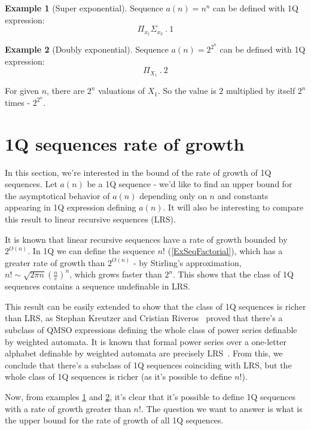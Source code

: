 \documentclass[12pt]{article}
\theoremstyle{definition}
\newtheorem{example}{Example}[section]
\begin{document}
\begin{example}[Super exponential]
\label{ExSeqNToN}
    Sequence $a(n) = n^n$ can be defined with 1Q expression:
    $$\Pi_{x_1}\Sigma_{x_2} \ . \ 1$$
\end{example}

\begin{example}[Doubly exponential]
\label{ExSeqDoubleExponential}
    Sequence $a(n) = 2^{2^n}$ can be defined with 1Q expression:
    $$\Pi_{X_1} \ . \ 2$$

    For given $n$, there are $2^n$ valuations of $X_1$. So the value is $2$ multiplied by itself $2^n$ times - $2^{2^n}$.
\end{example}

\section{1Q sequences rate of growth}
\label{Sec1QRateOfGrowth}
In this section, we're interested in the bound of the rate of growth of 1Q sequences. Let $a(n)$ be a 1Q sequence - we'd like to find an upper bound for the asymptotical behavior of $a(n)$ depending only on $n$ and constants appearing in 1Q expression defining $a(n)$. It will also be interesting to compare this result to linear recursive sequences (LRS).

It is known that linear recursive sequences have a rate of growth bounded by $2^{O(n)}$. In 1Q we can define the sequence $n!$ (\ref{ExSeqFactorial}), which has a greater rate of growth than $2^{O(n)}$ - by Stirling's approximation, $n! \sim \sqrt{2 \pi n} (\frac{n}{e})^n$, which grows faster than $2^n$. This shows that the class of 1Q sequences contains a sequence undefinable in LRS.

This result can be easily extended to show that the class of 1Q sequences is richer than LRS, as Stephan Kreutzer and Cristian Riveros~\cite{KreutzerR13} proved that there's a subclass of QMSO expressions defining the whole class of power series definable by weighted automata. It is known that formal power series over a one-letter alphabet definable by weighted automata are precisely LRS~\cite{BarloyFLM22}. From this, we conclude that there's a subclass of 1Q sequences coinciding with LRS, but the whole class of 1Q sequences is richer (as it's possible to define $n!$).

Now, from examples \ref{ExSeqNToN} and \ref{ExSeqDoubleExponential}, it's clear that it's possible to define 1Q sequences with a rate of growth greater than $n!$. The question we want to answer is what is the upper bound for the rate of growth of all 1Q sequences.
\end{document}
